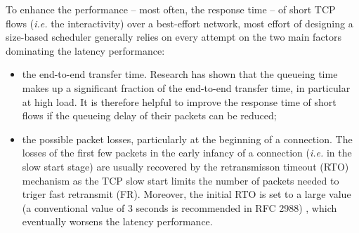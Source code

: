 \documentclass[preprint,12pt]{elsarticle}
\begin{document}
To enhance the performance -- most often, the response time -- of short TCP flows (\textit{i.e.} the interactivity) over a best-effort network, most effort of designing a size-based scheduler generally relies on every attempt on the two main factors dominating the latency performance:

\begin{itemize}
\item the end-to-end transfer time. Research has shown that the queueing time makes up a significant fraction of the end-to-end transfer time, in particular at high load. It is therefore helpful to improve the response time of short flows if the queueing delay of their packets can be reduced;
\item the possible packet losses, particularly at the beginning of a connection. The losses of the first few packets in the early infancy of a connection (\textit{i.e.} in the slow start stage) are usually recovered by the retransmisson timeout (RTO) mechanism as the TCP slow start limits the number of packets needed to triger fast retransmit (FR). Moreover, the initial RTO is set to a large value (a conventional value of 3 seconds is recommended in RFC 2988) , which eventually worsens the latency performance. 
\end{itemize}
\end{document}
